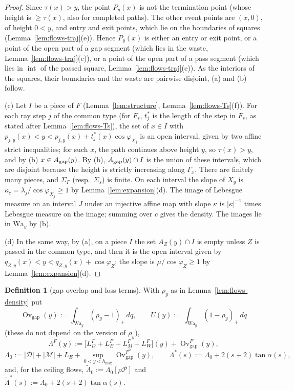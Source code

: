 \documentclass[11pt]{amsart}
\newcommand{\Ovgap}{\operatorname{Ov}_{\mathrm{gap}}}
\newcommand{\hmax}{h_{\max}}
\newcommand{\Lam}{\Lambda}
\newcommand{\Fz}{F^{0}}
\newcommand{\Fs}{F_{s}}
\theoremstyle{definition}
\newtheorem{definition}[theorem]{Definition}
\theoremstyle{remark}
\numberwithin{equation}{section}
\begin{document}
\begin{proof}
Since $\tau(x)>y$, the point $P_y(x)$ is not the termination point (whose height is $\ge\tau(x)$, also for completed
paths). The other event points are $(x,0)$, of height $0<y$, and entry and exit points, which lie on the boundaries of
squares (Lemma~\ref{lem:flows-traj}(e)). Hence $P_y(x)$ is either an entry or exit point, or a point of the open part of
a gap segment (which lies in the waste, Lemma~\ref{lem:flows-traj}(c)), or a point of the open part of a pass segment
(which lies in $\operatorname{int}$ of the passed square, Lemma~\ref{lem:flows-traj}(e)). As the interiors of the squares,
their boundaries and the waste are pairwise disjoint, (a) and (b) follow.

(c) Let $I$ be a piece of $F$ (Lemma~\ref{lem:structure}, Lemma~\ref{lem:flows-Ts}(f)). For each ray step $j$ of the
common type (for $\Fs$, $t^*_j$ is the length of the step in $\Fs$, as stated after Lemma~\ref{lem:flows-Ts}), the set of $x\in I$ with $p_{j,y}(x)<y<p_{j,y}(x)+t^*_j(x)\cos\varphi_{X_j}$ is an open interval, given by two
affine strict inequalities; for such $x$, the path continues above height $y$, so $\tau(x)>y$, and by (b)
$x\in A_{\rm gap}(y)$. By (b), $A_{\rm gap}(y)\cap I$ is the union of these intervals, which are disjoint because the
height is strictly increasing along $\Gamma_x$. There are finitely many pieces, and $\Sigma_F$ (resp.\ $\Sigma_s$) is
finite. On each interval the slope of $X_y$ is $\kappa_c=\lambda_j/\cos\varphi_{X_j}\ge1$ by
Lemma~\ref{lem:expansion}(d). The image of Lebesgue measure on an interval $J$ under an injective affine map with slope
$\kappa$ is $|\kappa|^{-1}$ times Lebesgue measure on the image; summing over $c$ gives the density. The images lie in
$\mathrm{Wa}_y$ by (b).

(d) In the same way, by (a), on a piece $I$ the set $A_Z(y)\cap I$ is empty unless $Z$ is passed in the common type, and
then it is the open interval given by $q_{Z,y}(x)<y<q_{Z,y}(x)+\cos\varphi_Z$; the slope is $\mu/\cos\varphi_Z\ge1$ by
Lemma~\ref{lem:expansion}(d).
\end{proof}

\begin{definition}[gap overlap and loss terms]\label{def:flows-ovgap}
With $\rho_y$ as in Lemma~\ref{lem:flows-density} put
\[
\Ovgap(y):=\int_{\mathrm{Wa}_y}(\rho_y-1)_+\,dq,\qquad U(y):=\int_{\mathrm{Wa}_y}(1-\rho_y)_+\,dq
\]
(these do not depend on the version of $\rho_y$),
\[
\Lam^F(y):=\big[L^F_D+L^F_E+L^F_M+L^F_W\big](y)+\Ovgap^F(y),
\]
\[
\Lam_0:=|\mathcal D|+|\mathcal M|+L_E+\sup_{0<y<\hmax}\Ovgap^{\Fz}(y),\qquad \Lam^*(s):=\Lam_0+2(s+2)\tan\alpha(s),
\]
and, for the ceiling flows, $\tilde\Lam_0:=\Lam_0[\rho\mathcal P]$ and $\tilde\Lam^*(s):=\tilde\Lam_0+2(s+2)\tan\alpha(s)$.
\end{definition}
\end{document}
